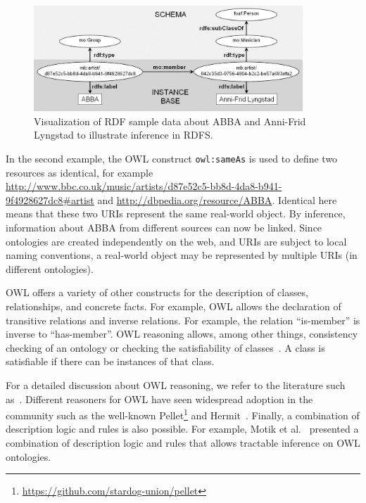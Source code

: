 \documentclass[a4paper,USenglish]{tgdk-v2021}
\begin{document}
\begin{figure}[ht]
  \centering
  \includegraphics[width=0.9\textwidth]{figs/rdf-example-graph}
\caption{Visualization of RDF sample data about ABBA and Anni-Frid Lyngstad to illustrate inference in RDFS.}\label{fig:rdf-example-graph}
\end{figure}

In the second example, the OWL construct \texttt{owl:sameAs} is used to define two resources as identical, for example
\url{http://www.bbc.co.uk/music/artists/d87e52c5-bb8d-4da8-b941-9f4928627dc8#artist} and \url{http://dbpedia.org/resource/ABBA}.
Identical here means that these two URIs represent the same real-world object.
By inference, information about ABBA from different sources can now be linked.
Since ontologies are created independently on the web, and URIs are subject to local naming conventions, a real-world object may be represented by multiple URIs (in different ontologies).  

OWL offers a variety of other constructs for the description of classes, relationships, and concrete facts. 
For example, OWL allows the declaration of transitive relations and inverse relations. 
For example, the relation ``is-member'' is inverse to ``has-member''.
OWL reasoning allows, among other things, consistency checking of an ontology or checking the satisfiability of classes~\cite{DBLP:reference/sp/HorrocksP11}.
A class is satisfiable if there can be instances of that class.

For a detailed discussion about OWL reasoning, we refer to the literature such as~\cite{DBLP:reference/sp/HorrocksP11,DBLP:journals/sLogica/BaaderS01}.
Different reasoners for OWL have seen widespread adoption in the community such as the well-known Pellet\footnote{\url{https://github.com/stardog-union/pellet}} and Hermit~\cite{DBLP:journals/jar/GlimmHMSW14}.
Finally, a combination of description logic and rules is also possible.
For example, Motik et al.~\cite{DBLP:conf/semweb/MotikSS04} presented a combination of description logic and rules that allows tractable inference on OWL ontologies. 
\end{document}
